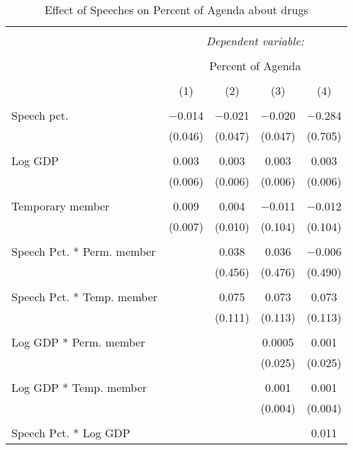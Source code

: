 
\begin{table}[!htbp] \centering 
  \caption{Effect of Speeches on Percent of Agenda about  drugs} 
  \label{} 
\begin{tabular}{@{\extracolsep{5pt}}lcccc} 
\\[-1.8ex]\hline 
\hline \\[-1.8ex] 
 & \multicolumn{4}{c}{\textit{Dependent variable:}} \\ 
\cline{2-5} 
\\[-1.8ex] & \multicolumn{4}{c}{Percent of Agenda} \\ 
\\[-1.8ex] & (1) & (2) & (3) & (4)\\ 
\hline \\[-1.8ex] 
 Speech pct. & $-$0.014 & $-$0.021 & $-$0.020 & $-$0.284 \\ 
  & (0.046) & (0.047) & (0.047) & (0.705) \\ 
  & & & & \\ 
 Log GDP & 0.003 & 0.003 & 0.003 & 0.003 \\ 
  & (0.006) & (0.006) & (0.006) & (0.006) \\ 
  & & & & \\ 
 Temporary member & 0.009 & 0.004 & $-$0.011 & $-$0.012 \\ 
  & (0.007) & (0.010) & (0.104) & (0.104) \\ 
  & & & & \\ 
 Speech Pct. * Perm. member &  & 0.038 & 0.036 & $-$0.006 \\ 
  &  & (0.456) & (0.476) & (0.490) \\ 
  & & & & \\ 
 Speech Pct. * Temp. member &  & 0.075 & 0.073 & 0.073 \\ 
  &  & (0.111) & (0.113) & (0.113) \\ 
  & & & & \\ 
 Log GDP * Perm. member &  &  & 0.0005 & 0.001 \\ 
  &  &  & (0.025) & (0.025) \\ 
  & & & & \\ 
 Log GDP * Temp. member &  &  & 0.001 & 0.001 \\ 
  &  &  & (0.004) & (0.004) \\ 
  & & & & \\ 
 Speech Pct. * Log GDP &  &  &  & 0.011 \\ 

\end{tabular}
\end{table}

